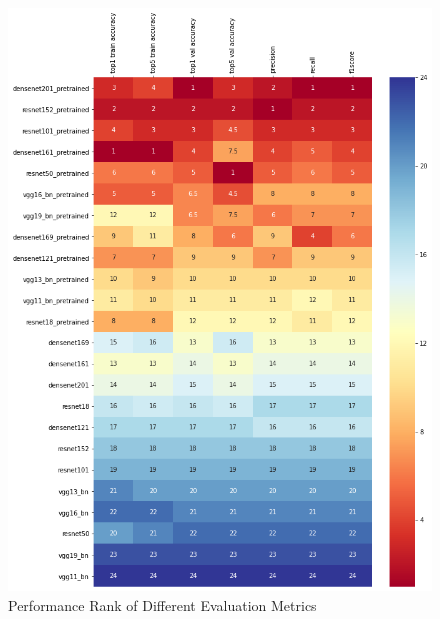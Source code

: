 \begin{figure}[H]
  \centering
  \includegraphics[width=\linewidth]{figs/rank.png}
  \caption{Performance Rank of Different Evaluation Metrics}
  \label{fig:rank}
\end{figure}

